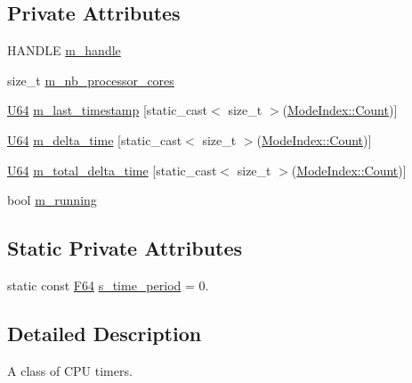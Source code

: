 \subsection*{Private Attributes}
\begin{DoxyCompactItemize}
\item 
H\+A\+N\+D\+LE \hyperlink{classmage_1_1_c_p_u_timer_a95b8ac18c050ed25293c8a923087369a}{m\+\_\+handle}
\item 
size\+\_\+t \hyperlink{classmage_1_1_c_p_u_timer_ac5fdb38a70c74815231b5efd8d746be1}{m\+\_\+nb\+\_\+processor\+\_\+cores}
\item 
\hyperlink{namespacemage_a6672cf3c861707ce4a3235a3eb43941d}{U64} \hyperlink{classmage_1_1_c_p_u_timer_a14b5ef7beba6c33769ac66ef171d0f0b}{m\+\_\+last\+\_\+timestamp} \mbox{[}static\+\_\+cast$<$ size\+\_\+t $>$(\hyperlink{classmage_1_1_c_p_u_timer_a98d59db3c396b14269c937e016c7625eae93f994f01c537c4e2f7d8528c3eb5e9}{Mode\+Index\+::\+Count})\mbox{]}
\item 
\hyperlink{namespacemage_a6672cf3c861707ce4a3235a3eb43941d}{U64} \hyperlink{classmage_1_1_c_p_u_timer_a2ce9eda81a57934b172b426238d4587d}{m\+\_\+delta\+\_\+time} \mbox{[}static\+\_\+cast$<$ size\+\_\+t $>$(\hyperlink{classmage_1_1_c_p_u_timer_a98d59db3c396b14269c937e016c7625eae93f994f01c537c4e2f7d8528c3eb5e9}{Mode\+Index\+::\+Count})\mbox{]}
\item 
\hyperlink{namespacemage_a6672cf3c861707ce4a3235a3eb43941d}{U64} \hyperlink{classmage_1_1_c_p_u_timer_a1c6d043eb08b1689d0f52dbd886fa9d4}{m\+\_\+total\+\_\+delta\+\_\+time} \mbox{[}static\+\_\+cast$<$ size\+\_\+t $>$(\hyperlink{classmage_1_1_c_p_u_timer_a98d59db3c396b14269c937e016c7625eae93f994f01c537c4e2f7d8528c3eb5e9}{Mode\+Index\+::\+Count})\mbox{]}
\item 
bool \hyperlink{classmage_1_1_c_p_u_timer_a7190afa453085b7bbd7cb76ff6bb62f2}{m\+\_\+running}
\end{DoxyCompactItemize}
\subsection*{Static Private Attributes}
\begin{DoxyCompactItemize}
\item 
static const \hyperlink{namespacemage_ad26233bbec640deda836e572c1a23708}{F64} \hyperlink{classmage_1_1_c_p_u_timer_acc0608b5b5d211b09486244e43fcfb87}{s\+\_\+time\+\_\+period} = 0.
\end{DoxyCompactItemize}


\subsection{Detailed Description}
A class of C\+PU timers. 

